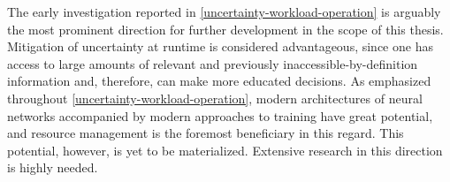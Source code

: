 The early investigation reported in \cref{uncertainty-workload-operation} is
arguably the most prominent direction for further development in the scope of
this thesis. Mitigation of uncertainty at runtime is considered advantageous,
since one has access to large amounts of relevant and previously
inaccessible-by-definition information and, therefore, can make more educated
decisions. As emphasized throughout \cref{uncertainty-workload-operation},
modern architectures of neural networks accompanied by modern approaches to
training have great potential, and resource management is the foremost
beneficiary in this regard. This potential, however, is yet to be materialized.
Extensive research in this direction is highly needed.
